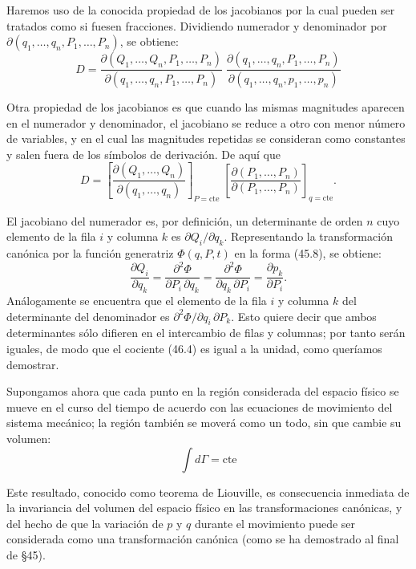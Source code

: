 \documentclass[12pt]{article}
\begin{document}
\noindent Haremos uso de la conocida propiedad de los jacobianos por la cual pueden ser tratados como si fuesen fracciones. Dividiendo numerador y denominador por
\(\partial(q_1,\dots,q_n,P_1,\dots,P_n)\), se obtiene:
\begin{equation}
D
=
\frac{\partial(Q_1,\dots,Q_n,P_1,\dots,P_n)}
     {\partial(q_1,\dots,q_n,P_1,\dots,P_n)}
\;
\frac{\partial(q_1,\dots,q_n,P_1,\dots,P_n)}
     {\partial(q_1,\dots,q_n,p_1,\dots,p_n)}
\tag{46.4}
\end{equation}

\noindent Otra propiedad de los jacobianos es que cuando las mismas magnitudes aparecen en el numerador y denominador, el jacobiano se reduce a otro con menor número de variables, y en el cual las magnitudes repetidas se consideran como constantes y salen fuera de los símbolos de derivación. De aquí que
\[
D
=
\left[\frac{\partial(Q_1,\dots,Q_n)}{\partial(q_1,\dots,q_n)}\right]_{P=\mathrm{cte}}
\;
\left[\frac{\partial(P_1,\dots,P_n)}{\partial(P_1,\dots,P_n)}\right]_{q=\mathrm{cte}}.
\]

\noindent El jacobiano del numerador es, por definición, un determinante de orden \(n\) cuyo elemento de la fila \(i\) y columna \(k\) es \(\partial Q_i/\partial q_k\). Representando la transformación canónica por la función generatriz \(\Phi(q,P,t)\) en la forma (45.8), se obtiene:
\[
\frac{\partial Q_i}{\partial q_k}
=
\frac{\partial^2\Phi}{\partial P_i\,\partial q_k}
=
\frac{\partial^2\Phi}{\partial q_k\,\partial P_i}
=
\frac{\partial p_k}{\partial P_i}.
\]
Análogamente se encuentra que el elemento de la fila \(i\) y columna \(k\) del determinante del denominador es \(\partial^2\Phi/\partial q_i\,\partial P_k\). Esto quiere decir que ambos determinantes sólo difieren en el intercambio de filas y columnas; por tanto serán iguales, de modo que el cociente (46.4) es igual a la unidad, como queríamos demostrar.

\noindent Supongamos ahora que cada punto en la región considerada del espacio físico se mueve en el curso del tiempo de acuerdo con las ecuaciones de movimiento del sistema mecánico; la región también se moverá como un todo, sin que cambie su volumen:
\begin{equation}
\int d\Gamma = \mathrm{cte}
\tag{46.5}
\end{equation}

\noindent Este resultado, conocido como teorema de Liouville, es consecuencia inmediata de la invariancia del volumen del espacio físico en las transformaciones canónicas, y del hecho de que la variación de \(p\) y \(q\) durante el movimiento puede ser considerada como una transformación canónica (como se ha demostrado al final de \S45).
\end{document}
